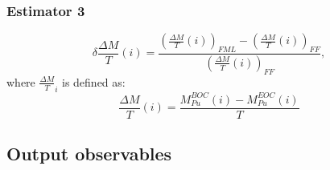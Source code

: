\subsubsection{Estimator 3}


\begin{equation}
    \delta{\frac{\Delta M}{T}}(i) =
        \frac{\left(\frac{\Delta M}{T}(i)\right)_{FML}
              - \left(\frac{\Delta M}{T}(i)\right)_{FF}}
             {\left(\frac{\Delta M}{T}(i)\right)_{FF}},
\end{equation}
where $\frac{\Delta M}{T}_{i}$ is defined as:
\begin{equation}
    \frac{\Delta M}{T}(i) = \frac{M_{Pu}^{BOC}(i) -
    M_{Pu}^{EOC}(i)}{T}
\end{equation}

\subsection{Output observables}



